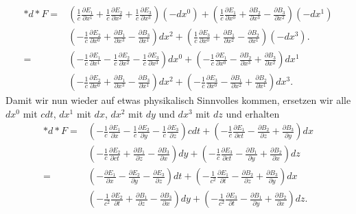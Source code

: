\begin{align*}
	\ast d \ast F = 
	&\left( \frac{1}{c}\frac{\partial E_1}{\partial x^1} + \frac{1}{c}\frac{\partial E_2}{\partial x^2} + \frac{1}{c}\frac{\partial E_3}{\partial x^3} \right) (-dx^0) +
	\left(\frac{1}{c}\frac{\partial E_1}{\partial x^0} + \frac{\partial B_2}{\partial x^3} - \frac{\partial B_3}{\partial x^2} \right) (-dx^1)\\
	&\left( -\frac{1}{c}\frac{\partial E_2}{\partial x^0} + \frac{\partial B_1}{\partial x^3} - \frac{\partial B_3}{\partial x^1} \right) dx^2 +
	\left( \frac{1}{c}\frac{\partial E_3}{\partial x^0} + \frac{\partial B_1}{\partial x^2} - \frac{\partial B_2}{\partial x^1} \right) (-dx^3).\\
	=
	&\left( -\frac{1}{c}\frac{\partial E_1}{\partial x^1} -\frac{1}{c}\frac{\partial E_2}{\partial x^2} - \frac{1}{c}\frac{\partial E_3}{\partial x^3} \right) dx^0 +
	\left(-\frac{1}{c}\frac{\partial E_1}{\partial x^0} - \frac{\partial B_2}{\partial x^3} + \frac{\partial B_3}{\partial x^2} \right) dx^1\\
	&\left( -\frac{1}{c}\frac{\partial E_2}{\partial x^0} + \frac{\partial B_1}{\partial x^3} - \frac{\partial B_3}{\partial x^1} \right) dx^2 +
	\left( -\frac{1}{c}\frac{\partial E_3}{\partial x^0} - \frac{\partial B_1}{\partial x^2} + \frac{\partial B_2}{\partial x^1} \right) dx^3.
\end{align*}
Damit wir nun wieder auf etwas physikalisch Sinnvolles kommen, ersetzen wir alle $dx^0$ mit $cdt$, $dx^1$ mit $dx$, $dx^2$ mit $dy$ und $dx^3$ mit $dz$ und erhalten
\begin{align*}
	\ast d \ast F = 
	&\left( -\frac{1}{c}\frac{\partial E_1}{\partial x} -\frac{1}{c}\frac{\partial E_2}{\partial y} - \frac{1}{c}\frac{\partial E_3}{\partial z} \right) cdt +
	\left(-\frac{1}{c}\frac{\partial E_1}{\partial ct} - \frac{\partial B_2}{\partial z} + \frac{\partial B_3}{\partial y} \right) dx\\
	&\left( -\frac{1}{c}\frac{\partial E_2}{\partial ct} + \frac{\partial B_1}{\partial z} - \frac{\partial B_3}{\partial x} \right) dy +
	\left( -\frac{1}{c}\frac{\partial E_3}{\partial ct} - \frac{\partial B_1}{\partial y} + \frac{\partial B_2}{\partial x} \right) dz\\
	=&\left( -\frac{\partial E_1}{\partial x} -\frac{\partial E_2}{\partial y} - \frac{\partial E_3}{\partial z} \right) dt +
	\left(-\frac{1}{c^2}\frac{\partial E_1}{\partial t} - \frac{\partial B_2}{\partial z} + \frac{\partial B_3}{\partial y} \right) dx\\
	&\left( -\frac{1}{c^2}\frac{\partial E_2}{\partial t} + \frac{\partial B_1}{\partial z} - \frac{\partial B_3}{\partial x} \right) dy +
	\left( -\frac{1}{c^2}\frac{\partial E_3}{\partial t} - \frac{\partial B_1}{\partial y} + \frac{\partial B_2}{\partial x} \right) dz.
\end{align*}

